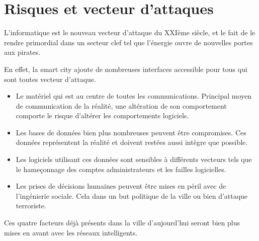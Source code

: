 \section{Risques et vecteur d'attaques}

L'informatique est le nouveau vecteur d'attaque du XXIème siècle, et le fait de le rendre primordial
dans un secteur clef tel que l'énergie ouvre de nouvelles portes aux pirates.

En effet, la smart city ajoute de nombreuses interfaces accessible pour tous qui sont toutes
vecteur d'attaque.


\begin{itemize}
  \item Le matériel qui est au centre de toutes les communications.
        Principal moyen de communication de la réalité, une altération de son
        comportement comporte le risque d'altérer les comportements logiciels.
  \item Les bases de données bien plus nombreuses peuvent être compromises.
        Ces données représentent la réalité et doivent restées aussi intègre que possible.
  \item Les logiciels utilisant ces données sont sensibles à différents vecteurs tels que le
        hameçonnage des comptes administrateurs et les failles logicielles.
  \item Les prises de décisions humaines peuvent être mises en péril avec de l'ingénierie sociale.
        Cela dans un but politique de la ville ou bien d'attaque terroriste.
\end{itemize}

Ces quatre facteurs déjà présents dans la ville d'aujourd'hui seront bien plus mises en avant avec
les réseaux intelligents.
